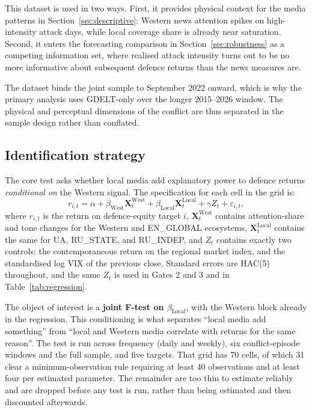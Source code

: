 \documentclass[12pt,a4paper]{article}
\begin{document}
This dataset is used in two ways. First, it provides physical context for the media patterns in Section~\ref{sec:descriptive}: Western news attention spikes on high-intensity attack days, while local coverage share is already near saturation. Second, it enters the forecasting comparison in Section~\ref{sec:robustness} as a competing information set, where realised attack intensity turns out to be no more informative about subsequent defence returns than the news measures are.

The dataset binds the joint sample to September 2022 onward, which is why the primary analysis uses GDELT-only over the longer 2015--2026 window. The physical and perceptual dimensions of the conflict are thus separated in the sample design rather than conflated.

\subsection{Identification strategy}
\label{sec:identification}

The core test asks whether local media add explanatory power to defence returns \textit{conditional on} the Western signal. The specification for each cell in the grid is:
\begin{equation}
r_{i,t} = \alpha + \beta_{\mathrm{West}} \mathbf{X}^{\mathrm{West}}_t + \beta_{\mathrm{Local}} \mathbf{X}^{\mathrm{Local}}_t + \gamma Z_t + \varepsilon_{i,t},
\label{eq:main}
\end{equation}
where $r_{i,t}$ is the return on defence-equity target $i$, $\mathbf{X}^{\mathrm{West}}_t$ contains attention-share and tone changes for the Western and EN\_GLOBAL ecosystems, $\mathbf{X}^{\mathrm{Local}}_t$ contains the same for UA, RU\_STATE, and RU\_INDEP, and $Z_t$ contains exactly two controls: the contemporaneous return on the regional market index, and the standardised log VIX of the previous close. Standard errors are HAC(5) throughout, and the same $Z_t$ is used in Gates 2 and 3 and in Table~\ref{tab:regression}.

The object of interest is a \textbf{joint F-test on $\beta_{\mathrm{Local}}$}, with the Western block already in the regression. This conditioning is what separates ``local media add something'' from ``local and Western media correlate with returns for the same reason''. The test is run across frequency (daily and weekly), six conflict-episode windows and the full sample, and five targets. That grid has 70 cells, of which 31 clear a minimum-observation rule requiring at least 40 observations and at least four per estimated parameter. The remainder are too thin to estimate reliably and are dropped before any test is run, rather than being estimated and then discounted afterwards.
\end{document}
